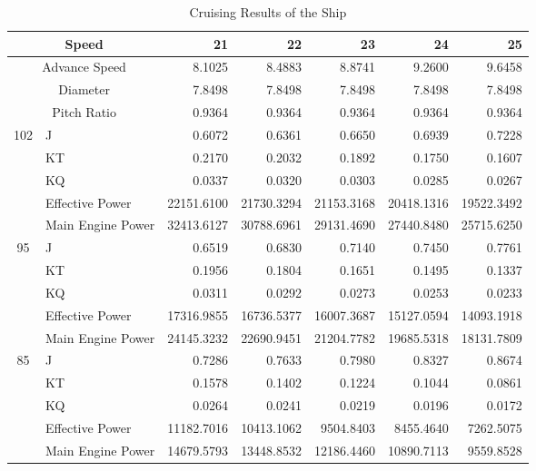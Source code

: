 \documentclass[a4paper,UTF8]{article}
\begin{document}
\begin{table}[htbp]

	\begin{tabular}{clrrrrr}
		\hline
		\multicolumn{2}{c}{Speed} & 21    & 22    & 23    & 24    & 25 \\
		\hline
		\multicolumn{2}{c}{Advance Speed} & 8.1025  & 8.4883  & 8.8741  & 9.2600  & 9.6458  \\
		\multicolumn{2}{c}{Diameter} & 7.8498  & 7.8498  & 7.8498  & 7.8498  & 7.8498  \\
		\multicolumn{2}{c}{Pitch Ratio} & 0.9364  & 0.9364  & 0.9364  & 0.9364  & 0.9364  \\
		\hline
		\multirow{5}[0]{*}{102} & J     & 0.6072  & 0.6361  & 0.6650  & 0.6939  & 0.7228  \\
		& KT    & 0.2170  & 0.2032  & 0.1892  & 0.1750  & 0.1607  \\
		& KQ    & 0.0337  & 0.0320  & 0.0303  & 0.0285  & 0.0267  \\
		& Effective Power & 22151.6100  & 21730.3294  & 21153.3168  & 20418.1316  & 19522.3492  \\
		& Main Engine Power & 32413.6127  & 30788.6961  & 29131.4690  & 27440.8480  & 25715.6250  \\
		\hline
		\multirow{5}[0]{*}{95} & J     & 0.6519  & 0.6830  & 0.7140  & 0.7450  & 0.7761  \\
		& KT    & 0.1956  & 0.1804  & 0.1651  & 0.1495  & 0.1337  \\
		& KQ    & 0.0311  & 0.0292  & 0.0273  & 0.0253  & 0.0233  \\
		& Effective Power & 17316.9855  & 16736.5377  & 16007.3687  & 15127.0594  & 14093.1918  \\
		& Main Engine Power & 24145.3232  & 22690.9451  & 21204.7782  & 19685.5318  & 18131.7809  \\
		\hline
		\multirow{5}[0]{*}{85} & J     & 0.7286  & 0.7633  & 0.7980  & 0.8327  & 0.8674  \\
		& KT    & 0.1578  & 0.1402  & 0.1224  & 0.1044  & 0.0861  \\
		& KQ    & 0.0264  & 0.0241  & 0.0219  & 0.0196  & 0.0172  \\
		& Effective Power & 11182.7016  & 10413.1062  & 9504.8403  & 8455.4640  & 7262.5075  \\
		& Main Engine Power & 14679.5793  & 13448.8532  & 12186.4460  & 10890.7113  & 9559.8528  \\
		\hline
	\end{tabular}%
	\caption{Cruising Results of the Ship}
	\label{tab:hangxingtexing}
\end{table}
\end{document}
